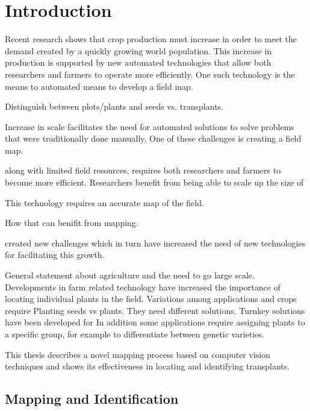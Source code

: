 
\cleardoublepage

\chapter{Introduction}
\label{introduction}

Recent research shows that crop production must increase in order to meet the demand created by a quickly growing world population.  This increase in production is supported by new automated technologies that allow both researchers and farmers to operate more efficiently.  One such technology is the means to automated means to develop a field map.  

Distinguish between plots/plants and seeds vs. transplants.     

Increase in scale facilitates the need for automated solutions to solve problems that were traditionally done manually.  One of these challenges is creating a field map.

  along with limited field resources, requires both researchers and farmers to become more efficient.  Researchers benefit from being able to scale up the size of 

This technology requires an accurate map of the field. 

How that can benifit from mapping.  

created new challenges 
   which in turn have increased the need of new technologies for facilitating this growth.

General statement about agriculture and the need to go large scale.  Developments in farm related technology have increased the importance of locating individual plants in the field.  Variations among applications and crops require   Planting seeds vs plants.  They need different solutions.  Turnkey solutions have been developed for   In addition some applications require assigning plants to a specific group, for example to differentiate between genetic varieties.   


This thesis describes a novel mapping process based on computer vision techniques and shows its effectiveness in locating and identifying transplants.

\section{Mapping and Identification}

